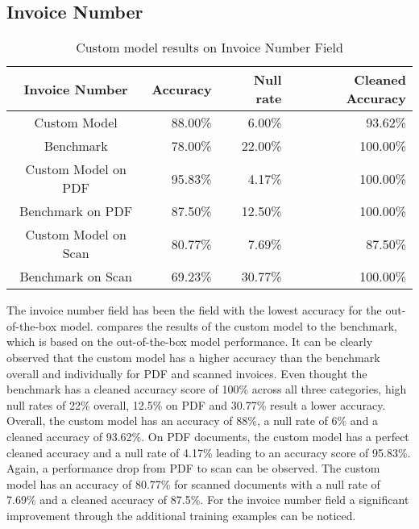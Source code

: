 \subsection*{Invoice Number}
\begin{table}[ht]   %
    \centering
    \footnotesize
    \begin{tabular}{c|rrr} %
        \toprule    %
        Invoice Number  & Accuracy  & Null rate & Cleaned Accuracy \\
        \midrule    %
        Custom Model               & 88.00\%   & 6.00\%   & 93.62\% \\
        Benchmark           & 78.00\%   & 22.00\%  & 100.00\%\\
        \midrule    %
        Custom Model on PDF        & 95.83\%   & 4.17\%  & 100.00\% \\
        Benchmark on PDF    & 87.50\%   & 12.50\%  & 100.00\% \\
        \midrule    %
        Custom Model on Scan       & 80.77\%  & 7.69\%   & 87.50\% \\
        Benchmark on Scan   & 69.23\%  & 30.77\%  & 100.00\% \\

        \bottomrule %
    \end{tabular}
    \caption{Custom model results on Invoice Number Field}
    \label{table:Model_Bench_Number}
\end{table}

The invoice number field has been the field with the lowest accuracy for the out-of-the-box model. 
 compares the results of the custom model to the benchmark, which is based on the out-of-the-box model performance.
It can be clearly observed that the custom model has a higher accuracy than the benchmark overall and individually for PDF and scanned invoices. 
Even thought the benchmark has a cleaned accuracy score of 100\% across all three categories, high null rates of 22\% overall, 12.5\% on PDF and 30.77\% result a lower accuracy.
Overall, the custom model has an accuracy of 88\%, a null rate of 6\% and a cleaned accuracy of 93.62\%. 
On PDF documents, the custom model has a perfect cleaned accuracy and a null rate of 4.17\% leading to an accuracy score of 95.83\%.
Again, a performance drop from PDF to scan can be observed. The custom model has an accuracy of 80.77\% for scanned documents with a null rate of 7.69\% and a cleaned accuracy of 87.5\%.
For the invoice number field a significant improvement through the additional training examples can be noticed.

